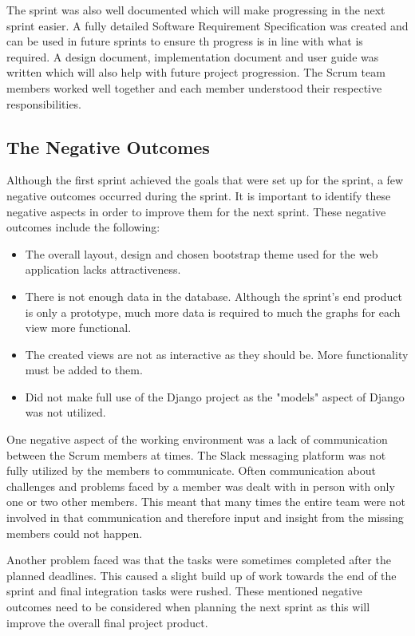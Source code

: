 \documentclass[12pt,onecolumn]{article}
\begin{document}
	The sprint was also well documented which will make progressing in the next sprint easier. A fully detailed Software Requirement Specification was created and can be used in future sprints to ensure th progress is in line with what is required. A design document, implementation document and user guide was written which will also help with future project progression. The Scrum team members worked well together and each member understood their respective responsibilities.
	
	\subsection{The Negative Outcomes} \label{neg}
	Although the first sprint achieved the goals that were set up for the sprint, a few negative outcomes occurred during the sprint. It is important to identify these negative aspects in order to improve them for the next sprint. These negative outcomes include the following:
	
	\begin{itemize}
		\item The overall layout, design and chosen bootstrap theme used for the web application lacks attractiveness.
		\item There is not enough data in the database. Although the sprint's end product is only a prototype, much more data is required to much the graphs for each view more functional.
		\item The created views are not as interactive as they should be. More functionality must be added to them.
		\item Did not make full use of the Django project as the "models" aspect of Django was not utilized. 
	\end{itemize}
	
	One negative aspect of the working environment was a lack of communication between the Scrum members at times. The Slack messaging platform was not fully utilized by the members to communicate. Often communication about challenges and problems faced by a member was dealt with in person with only one or two other members. This meant that many times the entire team were not involved in that communication and therefore input and insight from the missing members could not happen. 
	
	Another problem faced was that the tasks were sometimes completed after the planned deadlines. This caused a slight build up of work towards the end of the sprint and final integration tasks were rushed. These mentioned negative outcomes need to be considered when planning the next sprint as this will improve the overall final project product.
	
\end{document}

